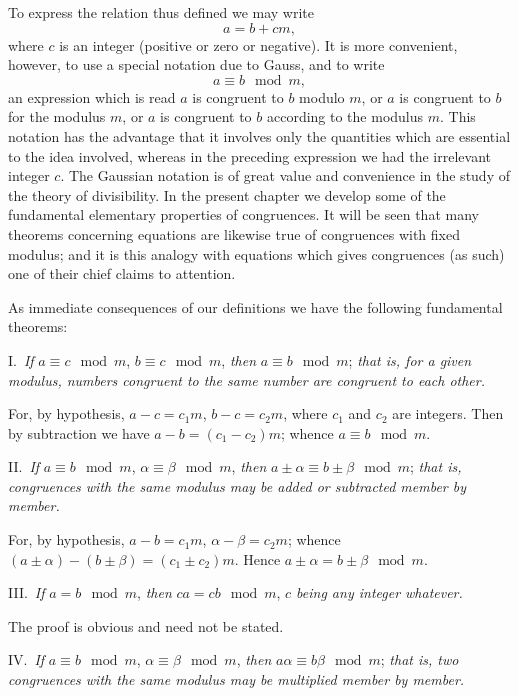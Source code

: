 \documentclass[oneside]{book}
\begin{document}
\smallskip To express the relation thus defined we may write
\begin{equation*}
a = b + cm,
\end{equation*}
where $c$ is an integer (positive or zero or negative). It is more
convenient, however, to use a special notation due to Gauss, and to
write
\begin{equation*}
a \equiv b \mod m,
\end{equation*}
an expression which is read $a$ is congruent to $b$ modulo $m$, or
$a$ is congruent to $b$ for the modulus $m$, or $a$ is congruent to
$b$ according to the modulus $m$. This notation has the
advantage that it involves only the quantities which are essential
to the idea involved, whereas in the preceding expression we had the
irrelevant integer $c$. The Gaussian notation is of great value and
convenience in the study of the theory of divisibility. In the
present chapter we develop some of the fundamental elementary
properties of congruences. It will be seen that many theorems
concerning equations are likewise true of congruences with fixed
modulus; and it is this analogy with equations which gives
congruences (as such) one of their chief claims to attention.

As immediate consequences of our definitions we have the following
fundamental theorems:

\smallskip I.~\emph{If} $a\equiv c \mod m$, $b\equiv c\mod m$,
\emph{then} $a\equiv b\mod m$; \noindent \emph{that is, for a given
modulus, numbers congruent to the same number are congruent to each
other.}

For, by hypothesis, $a - c = c_1 m$, $b - c = c_2 m$, where $c_1$
and $c_2$ are integers. Then by subtraction we have $a - b = (c_1 -
c_2) m$; whence $a \equiv b \mod m$.

\smallskip II.~\emph{If} $a \equiv b \mod m$, $\alpha \equiv
\beta \mod m$, \emph{then} $a \pm \alpha \equiv b \pm \beta \mod m$;
\emph{that is, congruences with the same modulus may be added or
subtracted member by member.}

For, by hypothesis, $a - b = c_1 m$, $\alpha - \beta = c_2 m$;
whence $(a \pm \alpha) - (b \pm \beta) = (c_1 \pm c_2)m$. Hence $a
\pm \alpha = b \pm \beta \mod m$.

\smallskip III.~\emph{If} $a = b \mod m$, \emph{then}
$ca = cb \mod m$, \emph{$c$ being any integer whatever.}

The proof is obvious and need not be stated.

\smallskip IV.~\emph{If} $a \equiv b \mod m$,
$\alpha \equiv \beta \mod m$, \emph{then} $a \alpha \equiv b \beta
\mod m$; \emph{that is, two congruences with the same modulus may be
multiplied member by member.}
\end{document}
